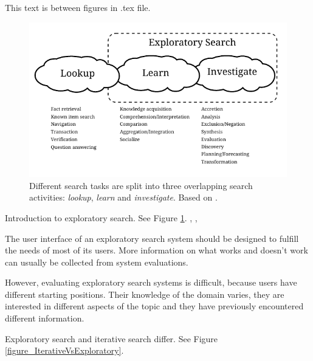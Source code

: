 This text is between figures in .tex file.

\begin{figure}[htp] %
\caption{Different search tasks are split into three overlapping search activities: \textit{lookup}, \textit{learn} and \textit{investigate}. Based on \protect\cite{march06}.}
\label{figure_3clouds}
\centering
\includegraphics[scale=0.8]{figures/3clouds2.pdf}
\end{figure}

Introduction to exploratory search. See Figure \ref{figure_3clouds}.
\cite{march06}, \cite{white09}, \cite{tvaro11}

The user interface of an exploratory search system should be designed to fulfill the needs of most of its users. More information on what works and doesn't work can usually be collected from system evaluations.

However, evaluating exploratory search systems is difficult, because users have different starting positions. Their knowledge of the domain varies, they are interested in different aspects of the topic and they have previously encountered different information. \cite{kules08}

Exploratory search and iterative search differ. See Figure \ref{figure_IterativeVsExploratory}.

